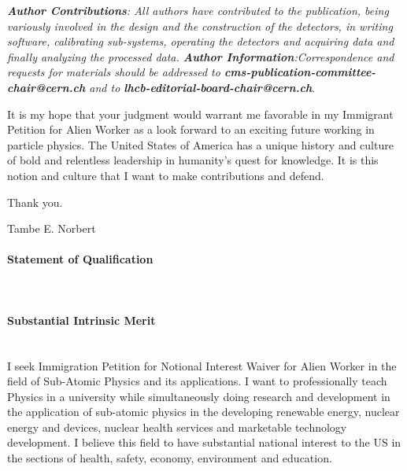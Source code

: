 \documentclass[12pt]{article}
\begin{document}
\textit{ \textbf{Author Contributions}: All authors have contributed to the publication, being variously involved in the design and the construction of the detectors, in writing software, calibrating sub-systems, operating the detectors and acquiring data and finally analyzing the processed data. 
\newline
\textbf{Author Information}:Correspondence and requests for materials should
be addressed to \textbf{cms-publication-committee-chair@cern.ch} and to
\textbf{lhcb-editorial-board-chair@cern.ch}}. 
\newline
\par
It is my hope that your judgment would warrant me favorable in my Immigrant Petition for Alien Worker as a look forward to an exciting future working in particle physics. \newline The United States of America has a unique history and culture of bold and relentless leadership in humanity's quest for knowledge. It is this notion and culture that I want to make contributions and defend.
\newline

Thank you.

Tambe E. Norbert


\paragraph{Statement of Qualification} \mbox{}\\
\paragraph{Substantial Intrinsic Merit} \mbox{} \\
I seek Immigration Petition for Notional Interest Waiver for Alien Worker
in the field of Sub-Atomic Physics and its applications. I want to professionally teach Physics in a university while simultaneously doing research and development in the application of sub-atomic physics in the developing renewable energy, nuclear energy and devices, nuclear health services and marketable technology development. 
I believe this field to have substantial national interest to the US in the sections of health, safety, economy, environment and education.
\end{document}
